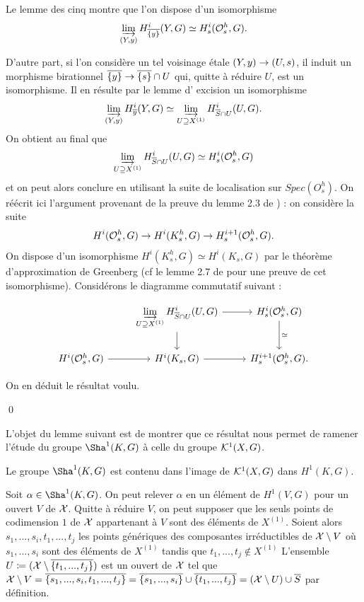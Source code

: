 \documentclass[11pt]{article}
\begin{document}
Le lemme des cinq montre que l'on dispose d'un isomorphisme
$$
\varinjlim_{(Y,y)}H^i_{\overline{\{y\}}}(Y,G) \simeq H^i_s(\mathcal{O}_s^h,G).
$$

D'autre part, si l'on considère un tel voisinage étale $(Y,y) \rightarrow (U,s)$, il induit un morphisme birationnel $\overline{\{y\}} \rightarrow \overline{\{s\}} \cap U$ qui, quitte à réduire $U$, est un isomorphisme. Il en résulte par le lemme d' excision un isomorphisme
$$
\varinjlim_{(Y,y)}H^i_{\overline{y}}(Y,G) \simeq \varinjlim_{U \supseteq X^{(1)}} H^i_{\overline{S}\cap U}(U,G).
$$
On obtient au final que
$$
\varinjlim_{U \supseteq X^{(1)}} H^i_{\overline{S}\cap U}(U,G) \simeq H^i_s(\mathcal{O}_s^h,G)
$$
et on peut alors conclure en utilisant la suite de localisation sur $Spec(O_s^h)$. On réécrit ici l'argument provenant de la preuve du lemme 2.3 de \cite{HarSza}) : on considère la suite
$$
H^i(\mathcal{O}_s^h,G) \rightarrow H^i(K_s^h,G) \rightarrow H^{i+1}_s(\mathcal{O}_s^h,G).
$$
On dispose d'un isomorphisme $H^i(K_s^h,G) \simeq H^i(K_s,G)$ par le théorème d'approximation de Greenberg \cite{Greenberg1966} (cf le lemme 2.7 de \cite{HarSza3} pour une preuve de cet isomorphisme). Considérons le diagramme commutatif suivant :

\[\begin{tikzcd}
     &\displaystyle \drl_{U \supseteq X^{(1)}} H^i_{\ol{S}\cap U}(U,G) & H^i_s(\CO_s^h,G) \\
 H^i(\CO_s^h,G) &  H^i(K_s,G) & H^{i+1}_s(\CO_s^h,G).
     \arrow[from=1-2, to=1-3]
     \arrow[from=1-3, to=2-3, "\simeq"]
     \arrow[from=2-1, to=2-2]
     \arrow[from=2-2, to=2-3]
     \arrow[from=1-2, to=2-2]
\end{tikzcd}\]

On en déduit le résultat voulu.

\qed

L'objet du lemme suivant est de montrer que ce résultat nous permet de ramener l'étude du groupe $\Sha^1(K,G)$ à celle du groupe $\mathcal{K}^1(X,G)$.

\lemme\label{lemfinal} Le groupe $\Sha^1(K,G)$ est contenu dans l'image de $\mathcal{K}^1(X,G)$ dans $H^1(K,G)$.

\proof Soit $\alpha \in \Sha^1(K,G)$. On peut relever $\alpha$ en un élément de $H^1(V,G)$ pour un ouvert $V$ de $\mathcal{X}$. Quitte à réduire $V$, on peut supposer que les seuls points de codimension $1$ de $\mathcal{X}$ appartenant à $V$ sont des éléments de $X^{(1)}$. Soient alors $s_1,...,s_i,t_1,...,t_j$ les points génériques des composantes irréductibles de $\mathcal{X} \setminus V$ où $s_1,...,s_i$  sont des éléments de $X^{(1)}$ tandis que $t_1,...,t_j \notin X^{(1)}$ 
L'ensemble $U \coloneqq (\CX \setminus \ol{\{t_1,...,t_j\}} )$ est un ouvert de $\mathcal{X}$ tel que $\mathcal{X} \setminus V = \overline{\{s_1,...,s_i,t_1,...,t_j\}} = \overline{\{s_1,...,s_i\}} \cup \overline{\{t_1,...,t_j\}} = (\mathcal{X} \setminus U) \cup \overline{S}$ par définition.
\end{document}
